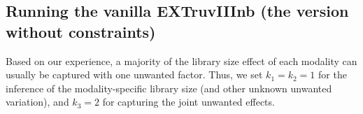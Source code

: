 \documentclass[]{article}
\newcommand{\hlnum}[1]{\textcolor[rgb]{0.816,0.125,0.439}{#1}}%
\newcommand{\hlstr}[1]{\textcolor[rgb]{0.251,0.627,0.251}{#1}}%
\newcommand{\hlcom}[1]{\textcolor[rgb]{0.502,0.502,0.502}{\textit{#1}}}%
\newcommand{\hlstd}[1]{\textcolor[rgb]{0.251,0.251,0.251}{#1}}%
\newcommand{\hlkwd}[1]{\textcolor[rgb]{0.878,0.439,0.125}{#1}}%
\newenvironment{Shaded}{\begin{myshaded}}{\end{myshaded}}
\newcommand{\DecValTok}[1]{\hlnum{#1}}
\newcommand{\SpecialCharTok}[1]{\hlstr{#1}}
\newcommand{\CommentTok}[1]{\hlcom{#1}}
\newcommand{\OtherTok}[1]{{#1}}
\newcommand{\FunctionTok}[1]{\hlstd{#1}}
\newcommand{\ControlFlowTok}[1]{\hlkwd{#1}}
\newcommand{\NormalTok}[1]{\hlstd{#1}}
\begin{document}
\subsection{Running the vanilla EXTruvIIInb (the version without constraints)}\label{running-the-vanilla-extruviiinb-the-version-without-constraints}

Based on our experience, a majority of the library size effect of each modality can usually be captured with one unwanted factor. Thus, we set \(k_1=k_2=1\) for the inference of the modality-specific library size (and other unknown unwanted variation), and \(k_3=2\) for capturing the joint unwanted effects.

\begin{Shaded}
\end{Shaded}
\end{document}

